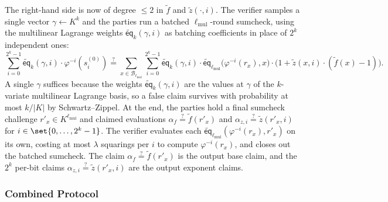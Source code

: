 \documentclass{article}
\theoremstyle{definition}
\newcommand*{\mle}{\widetilde}
\newcommand{\eq}{\mathsf{eq}}
\newcommand{\BB}{\mathcal{B}}
\begin{document}
The right-hand side is now of degree $\leq 2$ in $\mle{f}$ and $\mle{z}(\cdot, i)$. The verifier samples a single vector $\gamma \gets K^k$ and the parties run a batched $\ell_\text{mul}$-round sumcheck, using the multilinear Lagrange weights $\mle{\eq}_k(\gamma, i)$ as batching coefficients in place of $2^k$ independent ones:
\[
  \sum_{i = 0}^{2^k - 1} \mle{\eq}_k(\gamma, i) \cdot \varphi^{-i}(s^{(0)}_i) \stackrel{?}{=} \sum_{x \in \BB_{\ell_\text{mul}}} \sum_{i = 0}^{2^k - 1} \mle{\eq}_k(\gamma, i) \cdot \mle{\eq}_{\ell_\text{mul}}\bigl( \varphi^{-i}(r_x), x \bigr) \cdot \bigl( 1 + \mle{z}(x, i) \cdot (\mle{f}(x) - 1) \bigr).
\]
A single $\gamma$ suffices because the weights $\mle{\eq}_k(\gamma, i)$ are the values at $\gamma$ of the $k$-variate multilinear Lagrange basis, so a false claim survives with probability at most $k / |K|$ by Schwartz--Zippel. At the end, the parties hold a final sumcheck challenge $r'_x \in K^{\ell_\text{mul}}$ and claimed evaluations $\alpha_f \stackrel{?}{=} \mle{f}(r'_x)$ and $\alpha_{z, i} \stackrel{?}{=} \mle{z}(r'_x, i)$ for $i \in \set{0, \ldots, 2^k - 1}$. The verifier evaluates each $\mle{\eq}_{\ell_\text{mul}}(\varphi^{-i}(r_x), r'_x)$ on its own, costing at most $\lambda$ squarings per $i$ to compute $\varphi^{-i}(r_x)$, and closes out the batched sumcheck. The claim $\alpha_f \stackrel{?}{=} \mle{f}(r'_x)$ is the output base claim, and the $2^k$ per-bit claims $\alpha_{z, i} \stackrel{?}{=} \mle{z}(r'_x, i)$ are the output exponent claims.

\subsubsection{Combined Protocol}
\label{sec:intmul-combined}
\end{document}
